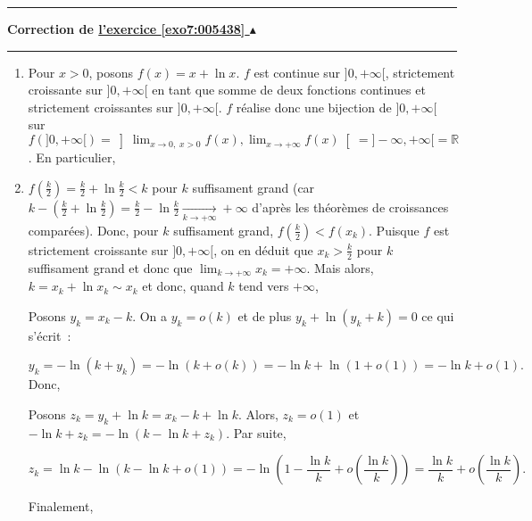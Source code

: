 \documentclass[11pt,a4paper]{article}
\newcommand{\Rr}{\mathbb{R}} \newcommand{\R}{\mathbb{R}}
\newcounter{exo}
\newcommand{\correction}[1]{\hypertarget{cor7:#1}{}\label{cor7:#1}{\bf Correction de \hyperlink{exo7:#1}{l'exercice \ref{exo7:#1} $\blacktriangle$}}\vspace{1mm}\hrule\vspace{1mm}}
\newcommand{\fincorrection}{\vspace{1mm}\hrule\vspace*{7mm}}
\begin{document}
\fincorrection
\correction{005438}
\begin{enumerate}
 \item  Pour $x>0$, posons $f(x)=x+\ln x$. $f$ est continue sur $]0,+\infty[$, strictement croissante sur $]0,+\infty[$ en tant que somme de deux fonctions continues et strictement croissantes sur $]0,+\infty[$. $f$ réalise donc une bijection de $]0,+\infty[$ sur $f\left(]0,+\infty[\right)=\left]\lim_{x\rightarrow 0,\;x>0}f(x),\lim_{x\rightarrow +\infty}f(x)\right[=]-\infty,+\infty[=\Rr$. En particulier,

\begin{center}
\shadowbox{
$\forall k\in\Rr,\;\exists!x_k\in]0,+\infty[/\;f(x_k)=k.$
}
\end{center}
 \item  $f\left(\frac{k}{2}\right)=\frac{k}{2}+\ln\frac{k}{2}<k$ pour $k$ suffisament grand (car $k-(\frac{k}{2}+\ln\frac{k}{2})=\frac{k}{2}-\ln\frac{k}{2}\underset{k\rightarrow+\infty}{\rightarrow}+\infty$ d'après les théorèmes de croissances comparées). Donc, pour $k$ suffisament grand, $f\left(\frac{k}{2}\right)<f(x_k)$. Puisque $f$ est strictement croissante sur $]0,+\infty[$, on en déduit que $x_k>\frac{k}{2}$ pour $k$ suffisament grand et donc que $\lim_{k\rightarrow +\infty}x_k=+\infty$. Mais alors, $k=x_k+\ln x_k\sim x_k$ et donc, quand $k$ tend vers $+\infty$,

\begin{center}
\end{center}
Posons $y_k=x_k-k$. On a $y_k=o(k)$ et de plus $y_k+\ln(y_k+k)=0$ ce qui s'écrit~:

$$y_k=-\ln(k+y_k)=-\ln(k+o(k))=-\ln k+\ln(1+o(1))=-\ln k+o(1).$$
Donc,

\begin{center}
\end{center}
Posons $z_k=y_k+\ln k=x_k-k+\ln k$. Alors, $z_k=o(1)$ et $-\ln k+z_k=-\ln(k-\ln k+z_k)$. Par suite,

$$z_k=\ln k-\ln(k-\ln k+o(1))=-\ln\left(1-\frac{\ln k}{k}+o\left(\frac{\ln k}{k}\right)\right)=\frac{\ln k}{k}+o\left(\frac{\ln k}{k}\right).$$

Finalement,

\begin{center}
\end{center}
\end{enumerate}
\end{document}
